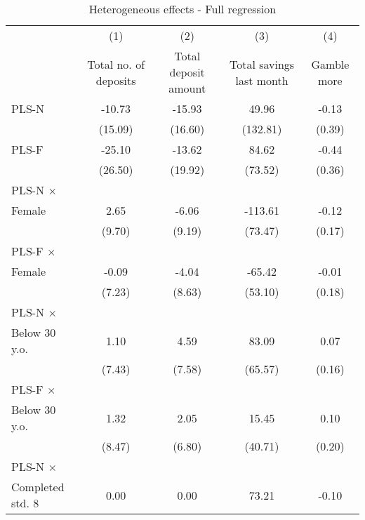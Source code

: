 \begin{table}[htbp]\centering
\def\sym#1{\ifmmode^{#1}\else\(^{#1}\)\fi}
\caption{Heterogeneous effects - Full regression}
\begin{tabular}{l*{4}{c}}
\toprule
                &\multicolumn{1}{c}{(1)}&\multicolumn{1}{c}{(2)}&\multicolumn{1}{c}{(3)}&\multicolumn{1}{c}{(4)}\\
                &\multicolumn{1}{c}{Total no. of deposits}&\multicolumn{1}{c}{Total deposit amount}&\multicolumn{1}{c}{Total savings last month}&\multicolumn{1}{c}{Gamble more}\\
\midrule
PLS-N           &   -10.73         &   -15.93         &    49.96         &    -0.13         \\
                &  (15.09)         &  (16.60)         & (132.81)         &   (0.39)         \\
\addlinespace
PLS-F           &   -25.10         &   -13.62         &    84.62         &    -0.44         \\
                &  (26.50)         &  (19.92)         &  (73.52)         &   (0.36)         \\
\addlinespace
PLS-N $\times$ \\ Female&     2.65         &    -6.06         &  -113.61         &    -0.12         \\
                &   (9.70)         &   (9.19)         &  (73.47)         &   (0.17)         \\
\addlinespace
PLS-F $\times$ \\ Female&    -0.09         &    -4.04         &   -65.42         &    -0.01         \\
                &   (7.23)         &   (8.63)         &  (53.10)         &   (0.18)         \\
\addlinespace
PLS-N $\times$ \\ Below 30 y.o.&     1.10         &     4.59         &    83.09         &     0.07         \\
                &   (7.43)         &   (7.58)         &  (65.57)         &   (0.16)         \\
\addlinespace
PLS-F $\times$ \\ Below 30 y.o.&     1.32         &     2.05         &    15.45         &     0.10         \\
                &   (8.47)         &   (6.80)         &  (40.71)         &   (0.20)         \\
\addlinespace
PLS-N $\times$ \\ Completed std. 8&     0.00         &     0.00         &    73.21         &    -0.10         \\

\end{tabular}
\end{table}
